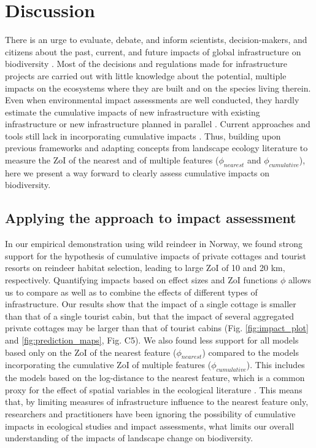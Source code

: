 \documentclass[titlepage]{article}
\begin{document}
\section{Discussion}

There is an urge to evaluate, debate, and inform scientists, decision-makers, and citizens about the past, current, and future impacts of global infrastructure on biodiversity \citep{laurance_conservation_2018}. Most of the decisions and regulations made for infrastructure projects are carried out with little knowledge about the potential, multiple impacts on the ecosystems where they are built and on the species living therein. Even when environmental impact assessments are well conducted, they hardly estimate the cumulative impacts of new infrastructure with existing infrastructure or new infrastructure planned in parallel \citep{laurance_roads_2017, johnson_regulating_2011}. Current approaches and tools still lack in incorporating cumulative impacts \citep[but see][for recent advances]{gillingham_integration_2016}. Thus, building upon previous frameworks \citep{naugle_unifying_2011} and adapting concepts from landscape ecology literature to measure the ZoI of the nearest and of multiple features ($\phi_{nearest}$ and $\phi_{cumulative}$), here we present a way forward to clearly assess cumulative impacts on biodiversity. 

\subsection{Applying the approach to impact assessment}

In our empirical demonstration using wild reindeer in Norway, we found strong support for the hypothesis of cumulative impacts of private cottages and tourist resorts on reindeer habitat selection, leading to large ZoI of 10 and 20 km, respectively. Quantifying impacts based on effect sizes and ZoI functions $\phi$ allows us to compare as well as to combine the effects of different types of infrastructure. Our results show that the impact of a single cottage is smaller than that of a single tourist cabin, but that the impact of several aggregated private cottages may be larger than that of tourist cabins (Fig. \ref{fig:impact_plot} and \ref{fig:prediction_maps}, Fig. C5). We also found less support for all models based only on the ZoI of the nearest feature ($\phi_{nearest}$) compared to the models incorporating the cumulative ZoI of multiple features ($\phi_{cumulative}$). This includes the models based on the log-distance to the nearest feature, which is a common proxy for the effect of spatial variables in the ecological literature \citep[e.g.][]{torres_assessing_2016,polfus_identifying_2011}. This means that, by limiting measures of infrastructure influence to the nearest feature only, researchers and practitioners have been ignoring the possibility of cumulative impacts in ecological studies and impact assessments, what limits our overall understanding of the impacts of landscape change on biodiversity.
\end{document}
